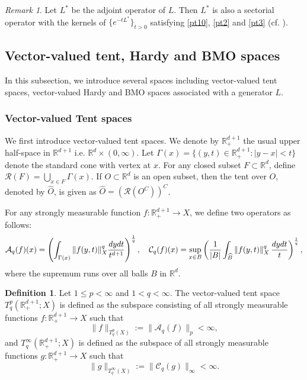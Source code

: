 \documentclass[oneside,english,a4wide]{amsart}
\numberwithin{equation}{section}
\numberwithin{figure}{section}
\theoremstyle{plain}
\theoremstyle{plain}
\theoremstyle{definition}
\theoremstyle{plain}
\theoremstyle{remark}
\theoremstyle{definition}
\newtheorem{definition}[thm]{Definition}
\theoremstyle{remark}
\newtheorem{remark}[thm]{Remark}
\theoremstyle{definition}
\newcommand{\real}{{\mathbb R}}
\newcommand{\A}{{\mathcal A}}
\newcommand{\R}{{\mathcal R}}
\newcommand{\8}{+\infty}
\renewcommand{\1}{\mathbbm{1}}
\newcommand{\wh}{\widehat}
\newcommand\sk[1]{ \left( #1 \right) }
\renewcommand\d{{\rm d}}
\begin{document}
{\begin{remark}\label{rk:Lstar}
    Let $L^*$ be the adjoint operator of $L$. Then $L^*$ is also a sectorial operator with the kernels of $\{e^{-tL^*}\}_{t>0}$ satisfying \eqref{pt10}, \eqref{pt2} and \eqref{pt3} (cf. \cite[Theorem 6.10]{DXT}).
\end{remark}








\subsection{Vector-valued tent, Hardy and BMO spaces}
In this subsection, we introduce several spaces including vector-valued tent spaces, vector-valued Hardy and BMO spaces associated with a generator $L$. %

\subsubsection{Vector-valued Tent spaces}
We first introduce vector-valued tent spaces. We denote by $ \real^{d+1}_+ $ the usual upper half-space in $ \real^{d+1} $ i.e. $ \real^d \times (0,\infty)$. Let $ \Gamma(x) = \{ (y,t) \in \real^{d+1}_+ : |y-x|<t \} $ denote the standard cone with  vertex at $x$. For any closed subset $ F \subset \real^d $, define $ \R(F) = \bigcup_{x\in F} \Gamma(x) $. If $ O \subset \real^d $ is an open subset, then the tent over $ O $, denoted by $ \wh{O} $, is given as $ \wh{O} = \sk{\R(O^C)}^C $. 

For any strongly measurable function $f: \real^{d+1}_+ \to X$, we define two operators as follows:
\[
    \A_q(f)(x) = \sk{\int_{\Gamma(x)} \| f(y, t) \|_X^q \frac{\d y \d t}{t^{d+1}} }^{\frac{1}{q}},\quad \mathcal{C}_{q}(f)(x) = \sup_{x \in B} \sk{\frac{1}{|B|} \int_{\wh{B}} \|f(y,t)\|_X^q \,\frac{\d y\d t}{t}  }^\frac{1}{q},
\]
where the supremum runs over all balls $B$ in $\real^d$.
\begin{definition}
Let $1 \leq p < \infty$ and $1<q<\infty$. The vector-valued tent space {$T_q^p( \real^{d+1}_+; X)$} is defined as the subspace consisting of all strongly measurable functions $f: \real^{d+1}_+ \to X$ such that \[
    \| f \|_{T_q^p(X)} := \| \A_q(f) \|_p < \infty,
\] 
and $T_q^{\infty}( \real^{d+1}_+; X)$ is defined as the subspace of all strongly measurable functions $g: \real^{d+1}_+ \to X$ such that
\[
    \| g \|_{T_q^{\infty}(X)} := \| \mathcal{C}_q(g) \|_\infty < \infty.
\]
\end{definition}

}
\end{document}
